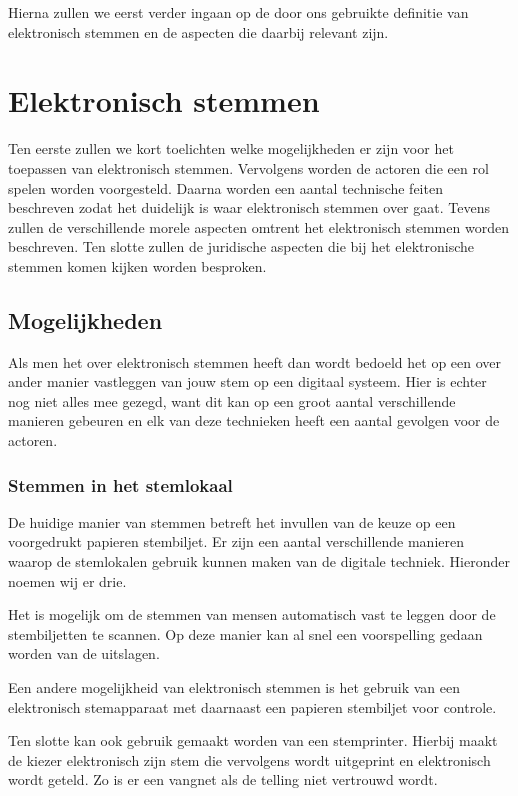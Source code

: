 \documentclass[a4paper]{article}
\begin{document}
Hierna zullen we eerst verder ingaan op de door ons gebruikte definitie van elektronisch stemmen en de aspecten die daarbij relevant zijn.

\newpage

\section{Elektronisch stemmen}
\label{text:elektronisch_stemmen}
Ten eerste zullen we kort toelichten welke mogelijkheden er zijn voor het toepassen van elektronisch stemmen. 
Vervolgens worden de actoren die een rol spelen worden voorgesteld. 
Daarna worden een aantal technische feiten beschreven zodat het duidelijk is waar elektronisch stemmen over gaat.
Tevens zullen de verschillende morele aspecten omtrent het elektronisch stemmen worden beschreven.
Ten slotte zullen de juridische aspecten die bij het elektronische stemmen komen kijken worden besproken.

\subsection{Mogelijkheden}
Als men het over elektronisch stemmen heeft dan wordt bedoeld het op een over ander manier vastleggen van jouw stem op een digitaal systeem.
Hier is echter nog niet alles mee gezegd, want dit kan op een groot aantal verschillende manieren gebeuren en elk van deze technieken heeft een aantal gevolgen voor de actoren. 

\subsubsection{Stemmen in het stemlokaal}
\label{text:stemlokaal}
De huidige manier van stemmen betreft het invullen van de keuze op een voorgedrukt papieren stembiljet. 
Er zijn een aantal verschillende manieren waarop de stemlokalen gebruik kunnen maken van de digitale techniek.
Hieronder noemen wij er drie. 

Het is mogelijk om de stemmen van mensen automatisch vast te leggen door de stembiljetten te scannen.
Op deze manier kan al snel een voorspelling gedaan worden van de uitslagen. 

Een andere mogelijkheid van elektronisch stemmen is het gebruik van een elektronisch stemapparaat met daarnaast een papieren stembiljet voor controle.

Ten slotte kan ook gebruik gemaakt worden van een stemprinter. 
Hierbij maakt de kiezer elektronisch zijn stem die vervolgens wordt uitgeprint en elektronisch wordt geteld. 
Zo is er een vangnet als de telling niet vertrouwd wordt.
\end{document}
